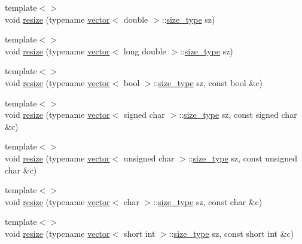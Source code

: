 \begin{DoxyCompactItemize}
\item 
{\footnotesize template$<$$>$ }\\void \mbox{\hyperlink{classvector_adafb42006f694fdf349ca118cf0180c6}{resize}} (typename \mbox{\hyperlink{classvector}{vector}}$<$ double $>$\+::\mbox{\hyperlink{classvector_ada51e68d31936547d3729c82daf6b7c6}{size\+\_\+type}} sz)
\item 
{\footnotesize template$<$$>$ }\\void \mbox{\hyperlink{classvector_a335d1f85064cfe9fffb2e19a5f514130}{resize}} (typename \mbox{\hyperlink{classvector}{vector}}$<$ long double $>$\+::\mbox{\hyperlink{classvector_ada51e68d31936547d3729c82daf6b7c6}{size\+\_\+type}} sz)
\item 
{\footnotesize template$<$$>$ }\\void \mbox{\hyperlink{classvector_a9913a7de24c5820acca73e631ac1fa3a}{resize}} (typename \mbox{\hyperlink{classvector}{vector}}$<$ bool $>$\+::\mbox{\hyperlink{classvector_ada51e68d31936547d3729c82daf6b7c6}{size\+\_\+type}} sz, const bool \&c)
\item 
{\footnotesize template$<$$>$ }\\void \mbox{\hyperlink{classvector_a7be7291b7dfc166063cd870bcdff33b4}{resize}} (typename \mbox{\hyperlink{classvector}{vector}}$<$ signed char $>$\+::\mbox{\hyperlink{classvector_ada51e68d31936547d3729c82daf6b7c6}{size\+\_\+type}} sz, const signed char \&c)
\item 
{\footnotesize template$<$$>$ }\\void \mbox{\hyperlink{classvector_a98db151c270302f1712c261b40459b64}{resize}} (typename \mbox{\hyperlink{classvector}{vector}}$<$ unsigned char $>$\+::\mbox{\hyperlink{classvector_ada51e68d31936547d3729c82daf6b7c6}{size\+\_\+type}} sz, const unsigned char \&c)
\item 
{\footnotesize template$<$$>$ }\\void \mbox{\hyperlink{classvector_afee78530471b10b7ff3edee141811000}{resize}} (typename \mbox{\hyperlink{classvector}{vector}}$<$ char $>$\+::\mbox{\hyperlink{classvector_ada51e68d31936547d3729c82daf6b7c6}{size\+\_\+type}} sz, const char \&c)
\item 
{\footnotesize template$<$$>$ }\\void \mbox{\hyperlink{classvector_ab25e895187190e7683edd677172f5997}{resize}} (typename \mbox{\hyperlink{classvector}{vector}}$<$ short int $>$\+::\mbox{\hyperlink{classvector_ada51e68d31936547d3729c82daf6b7c6}{size\+\_\+type}} sz, const short int \&c)
\item 

\end{DoxyCompactItemize}
